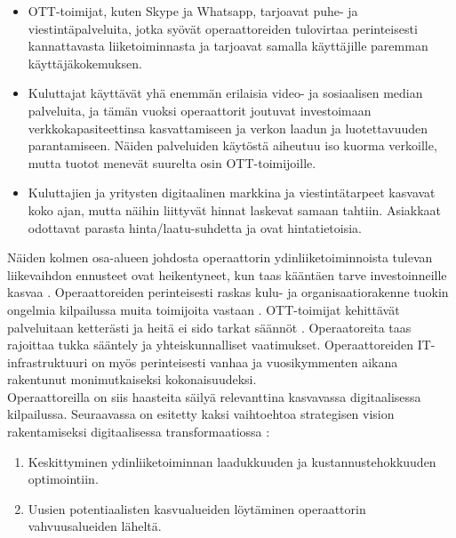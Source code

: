 \documentclass[finnish,12pt,a4paper,pdftex]{article}
\begin{document}
\begin{itemize}
    \item OTT-toimijat, kuten Skype ja Whatsapp, tarjoavat puhe- ja viestintäpalveluita, jotka syövät operaattoreiden tulovirtaa perinteisesti kannattavasta liiketoiminnasta ja tarjoavat samalla käyttäjille paremman käyttäjäkokemuksen. 
    \item Kuluttajat käyttävät yhä enemmän erilaisia video- ja sosiaalisen median palveluita, ja tämän vuoksi operaattorit joutuvat investoimaan verkkokapasiteettinsa kasvattamiseen ja verkon laadun ja luotettavuuden parantamiseen. Näiden palveluiden käytöstä aiheutuu iso kuorma verkoille, mutta tuotot menevät suurelta osin OTT-toimijoille.
    \item Kuluttajien ja yritysten digitaalinen markkina ja viestintätarpeet kasvavat koko ajan, mutta näihin liittyvät hinnat laskevat samaan tahtiin. Asiakkaat odottavat parasta hinta/laatu-suhdetta ja ovat hintatietoisia. 
\end{itemize}

\noindent Näiden kolmen osa-alueen johdosta operaattorin ydinliiketoiminnoista tulevan liikevaihdon ennusteet ovat heikentyneet, kun taas kääntäen tarve investoinneille kasvaa \citep{mckinseyope}. Operaattoreiden perinteisesti raskas kulu- ja organisaatiorakenne tuokin ongelmia kilpailussa muita toimijoita vastaan \citep{inderes}. OTT-toimijat kehittävät palveluitaan ketterästi ja heitä ei sido tarkat säännöt \citep{mckinseytele}. Operaatoreita taas rajoittaa tukka sääntely ja yhteiskunnalliset vaatimukset. Operaattoreiden IT-infrastruktuuri on myös perinteisesti vanhaa ja vuosikymmenten aikana rakentunut monimutkaiseksi kokonaisuudeksi. \\

Operaattoreilla on siis haasteita säilyä relevanttina kasvavassa digitaalisessa kilpailussa. Seuraavassa on esitetty kaksi vaihtoehtoa strategisen vision rakentamiseksi digitaalisessa transformaatiossa \citep{mckinseyope, inderes}:

\begin{enumerate}
    \item Keskittyminen ydinliiketoiminnan laadukkuuden ja kustannustehokkuuden optimointiin.
    \item Uusien potentiaalisten kasvualueiden löytäminen operaattorin vahvuusalueiden läheltä.
\end{enumerate}
\end{document}
